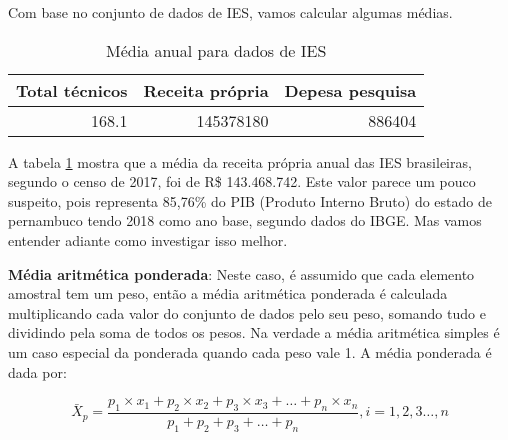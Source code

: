 \documentclass[12pt,]{style/krantz}
\makeatletter
\newenvironment{Shaded}{\begin{snugshade}}{\end{snugshade}}
\newcommand{\DataTypeTok}[1]{\textcolor[rgb]{0.13,0.29,0.53}{#1}}
\newcommand{\KeywordTok}[1]{\textcolor[rgb]{0.13,0.29,0.53}{\textbf{#1}}}
\newcommand{\NormalTok}[1]{#1}
\newcommand{\OperatorTok}[1]{\textcolor[rgb]{0.81,0.36,0.00}{\textbf{#1}}}
\newcommand{\StringTok}[1]{\textcolor[rgb]{0.31,0.60,0.02}{#1}}
\newenvironment{kframe}{%
\medskip{}
\setlength{\fboxsep}{.8em}
 \def\at@end@of@kframe{}%
 \ifinner\ifhmode%
  \def\at@end@of@kframe{\end{minipage}}%
  \begin{minipage}{\columnwidth}%
 \fi\fi%
 \def\FrameCommand##1{\hskip\@totalleftmargin \hskip-\fboxsep
 \colorbox{shadecolor}{##1}\hskip-\fboxsep
     \hskip-\linewidth \hskip-\@totalleftmargin \hskip\columnwidth}%
 \MakeFramed {\advance\hsize-\width
   \@totalleftmargin\z@ \linewidth\hsize
   \@setminipage}}%
 {\par\unskip\endMakeFramed%
 \at@end@of@kframe}
\renewenvironment{Shaded}{\begin{kframe}}{\end{kframe}}
\theoremstyle{definition}
\theoremstyle{definition}
\theoremstyle{definition}
\theoremstyle{remark}
\let\BeginKnitrBlock\begin \let\EndKnitrBlock\end
\makeatother
\begin{document}
\BeginKnitrBlock{example}
\protect\hypertarget{exm:unnamed-chunk-38}{}{\label{exm:unnamed-chunk-38} }Com base no conjunto de dados de IES, vamos calcular algumas médias.
\EndKnitrBlock{example}

\begin{Shaded}
\end{Shaded}

\begin{table}[!h]

\caption{\label{tab:tab06}Média anual para dados de IES}
\centering
\begin{tabular}{r|r|r}
\hline
Total técnicos & Receita própria & Depesa pesquisa\\
\hline
168.1 & 145378180 & 886404\\
\hline
\end{tabular}
\end{table}

A tabela \ref{tab:tab06} mostra que a média da receita própria anual das IES brasileiras, segundo o censo de 2017, foi de R\$ 143.468.742. Este valor parece um pouco suspeito, pois representa 85,76\% do PIB (Produto Interno Bruto) do estado de pernambuco tendo 2018 como ano base, segundo dados do IBGE. Mas vamos entender adiante como investigar isso melhor.

\textbf{Média aritmética ponderada}: Neste caso, é assumido que cada elemento amostral tem um peso, então a média aritmética ponderada é calculada multiplicando cada valor do conjunto de dados pelo seu peso, somando tudo e dividindo pela soma de todos os pesos. Na verdade a média aritmética simples é um caso especial da ponderada quando cada peso vale 1. A média ponderada é dada por:

\[\bar X_p = \frac{p_1 \times x_1 + p_2 \times x_2 + p_3\times  x_3 + \dots + p_n \times x_n}{p_1 + p_2 + p_3 + \dots + p_n}, i = 1, 2,3 \dots, n\]
\end{document}
